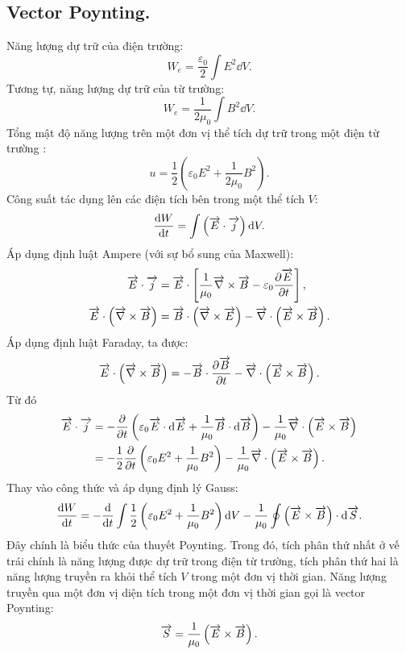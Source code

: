 \begin{appendices}
\subsection{Vector Poynting.}
 Năng lượng dự trữ của điện trường:
 $$W_e=\dfrac{\varepsilon_0}{2}\int E^2\dd V. $$   
 Tương tự, năng lượng dự trữ của từ trường:
 $$W_e=\dfrac{1}{2\mu_0}\int B^2\dd V.$$
 Tổng mật độ năng lượng trên một đơn vị thể tích dự trữ trong một điện từ trường :
 $$u=\dfrac{1}{2}\left(\varepsilon_0E^2+\dfrac{1}{2\mu_0}B^2\right).$$   
 Công suất tác dụng lên các điện tích bên trong một thể tích $V$:
 $$\dfrac{\mathrm{d} W}{\mathrm{d} t}=\int\left(\overrightarrow{E}\cdot\overrightarrow
 {j}\right)\mathrm{d} V.$$
 Áp dụng định luật Ampere (với sự bổ sung của Maxwell):
 \begin{align*}
 	\overrightarrow{E}\cdot\overrightarrow{j}&=\overrightarrow{E}\cdot\left[\dfrac{1}{\mu_0}\overrightarrow{\nabla}\times\overrightarrow{B}-\varepsilon_0\dfrac{\partial \overrightarrow{E}}{\partial t}\right],\\
 	\overrightarrow{E}\cdot\left(\overrightarrow{\nabla}\times\overrightarrow{B}\right)&=\overrightarrow{B}\cdot\left(\overrightarrow{\nabla}\times\overrightarrow{E}\right)-\overrightarrow{\nabla}\cdot\left(\overrightarrow{E}\times\overrightarrow{B}\right).\\
 \end{align*}
Áp dụng định luật Faraday, ta được:
$$\overrightarrow{E}\cdot\left(\overrightarrow{\nabla}\times\overrightarrow{B}\right)=-\overrightarrow{B}\cdot\dfrac{\partial \overrightarrow{B}}{\partial t}-\overrightarrow{\nabla}\cdot\left(\overrightarrow{E}\times\overrightarrow{B}\right).$$
Từ đó
\begin{align*}
	\overrightarrow{E}\cdot\overrightarrow{j}&=-\dfrac{\partial }{\partial t}\left(\varepsilon_0\overrightarrow{E}\cdot\mathrm{d}\overrightarrow{E}+\dfrac{1}{\mu_0}\overrightarrow{B}\cdot\mathrm{d}\overrightarrow{B}\right)-\dfrac{1}{\mu_0}\overrightarrow{\nabla}\cdot\left(\overrightarrow{E}\times\overrightarrow{B}\right)\\
	&=-\dfrac{1}{2}\dfrac{\partial }{\partial t}\left(\varepsilon_0 E^2+\dfrac{1}{\mu_0}B^2\right)-\dfrac{1}{\mu_0}\overrightarrow{\nabla}\cdot\left(\overrightarrow{E}\times\overrightarrow{B}\right).
	\end{align*}
Thay vào công thức và áp dụng định lý Gauss:
$$\dfrac{\mathrm{d} W}{\mathrm{d} t}= -\dfrac{\mathrm{d}}{\mathrm{d} t}\int\dfrac{1}{2}\left(\varepsilon_0 E^2+\dfrac{1}{\mu_0}B^2\right)\mathrm{d} V- \dfrac{1}{\mu_0}\oint \left(\overrightarrow{E}\times\overrightarrow{B}\right)\cdot\mathrm{d} \overrightarrow{S}.$$
Đây chính là biểu thức của thuyết Poynting. Trong đó, tích phân thứ nhất ở vế trái chính là năng lượng được dự trữ trong điện từ trường, tích phân thứ hai là năng lượng truyền ra khỏi thể tích $V$ trong một đơn vị thời gian. Năng lượng truyền qua một đơn vị diện tích trong một đơn vị thời gian gọi là vector Poynting:
$$\overrightarrow{S}=\dfrac{1}{\mu_0}\left(\overrightarrow{E}\times\overrightarrow{B}\right).$$

\end{appendices}
